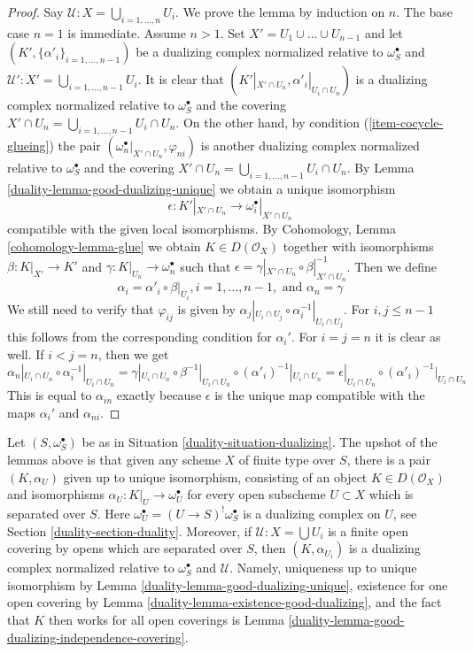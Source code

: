 \begin{proof}

Say $\mathcal{U} : X = \bigcup_{i = 1, \ldots, n} U_i$.
We prove the lemma by induction on $n$. The base case $n = 1$ is immediate.
Assume $n > 1$. Set $X' = U_1 \cup \ldots \cup U_{n - 1}$
and let $(K', \{\alpha'_i\}_{i = 1, \ldots, n - 1})$
be a dualizing complex normalized relative to $\omega_S^\bullet$
and $\mathcal{U}' : X' = \bigcup_{i = 1, \ldots, n - 1} U_i$.
It is clear that $(K'|_{X' \cap U_n}, \alpha'_i|_{U_i \cap U_n})$
is a dualizing complex normalized relative to $\omega_S^\bullet$
and the covering
$X' \cap U_n = \bigcup_{i = 1, \ldots, n - 1} U_i \cap U_n$.
On the other hand, by condition (\ref{item-cocycle-glueing}) the pair
$(\omega_n^\bullet|_{X' \cap U_n}, \varphi_{ni})$
is another dualizing complex normalized relative to $\omega_S^\bullet$
and the covering
$X' \cap U_n = \bigcup_{i = 1, \ldots, n - 1} U_i \cap U_n$.
By Lemma \ref{duality-lemma-good-dualizing-unique} we obtain a unique isomorphism
$$
\epsilon : K'|_{X' \cap U_n} \longrightarrow \omega_i^\bullet|_{X' \cap U_n}
$$
compatible with the given local isomorphisms.
By Cohomology, Lemma \ref{cohomology-lemma-glue}
we obtain $K \in D(\mathcal{O}_X)$ together with
isomorphisms $\beta : K|_{X'} \to K'$ and
$\gamma : K|_{U_n} \to \omega_n^\bullet$ such that
$\epsilon = \gamma|_{X'\cap U_n} \circ \beta|_{X' \cap U_n}^{-1}$.
Then we define
$$
\alpha_i = \alpha'_i \circ \beta|_{U_i}, i = 1, \ldots, n - 1,
\text{ and }
\alpha_n = \gamma
$$
We still need to verify that $\varphi_{ij}$ is given by
$\alpha_j|_{U_i \cap U_j} \circ \alpha_i^{-1}|_{U_i \cap U_j}$.
For $i, j \leq n - 1$ this follows from the corresponding
condition for $\alpha_i'$. For $i = j = n$ it is clear as well.
If $i < j = n$, then we get
$$
\alpha_n|_{U_i \cap U_n} \circ \alpha_i^{-1}|_{U_i \cap U_n} =
\gamma|_{U_i \cap U_n} \circ \beta^{-1}|_{U_i \cap U_n}
\circ (\alpha'_i)^{-1}|_{U_i \cap U_n} =
\epsilon|_{U_i \cap U_n} \circ (\alpha'_i)^{-1}|_{U_i \cap U_n}
$$
This is equal to $\alpha_{in}$ exactly because $\epsilon$
is the unique map compatible with the maps
$\alpha_i'$ and $\alpha_{ni}$.
\end{proof}

Let $(S, \omega_S^\bullet)$ be as in Situation \ref{duality-situation-dualizing}.
The upshot of the lemmas above is that given any scheme $X$ of finite type
over $S$, there is a pair $(K, \alpha_U)$ given up to unique isomorphism,
consisting of an object $K \in D(\mathcal{O}_X)$ and isomorphisms
$\alpha_U : K|_U \to \omega_U^\bullet$ for every open subscheme
$U \subset X$ which is separated over $S$. Here
$\omega_U^\bullet = (U \to S)^!\omega_S^\bullet$ is a dualizing
complex on $U$, see Section \ref{duality-section-duality}. Moreover, if
$\mathcal{U} : X = \bigcup U_i$ is a finite open covering
by opens which are separated over $S$, then
$(K, \alpha_{U_i})$ is a dualizing complex normalized relative to
$\omega_S^\bullet$ and $\mathcal{U}$.
Namely, uniqueness up to unique isomorphism by
Lemma \ref{duality-lemma-good-dualizing-unique},
existence for one open covering by
Lemma \ref{duality-lemma-existence-good-dualizing}, and
the fact that $K$ then works for all open coverings is
Lemma \ref{duality-lemma-good-dualizing-independence-covering}.

